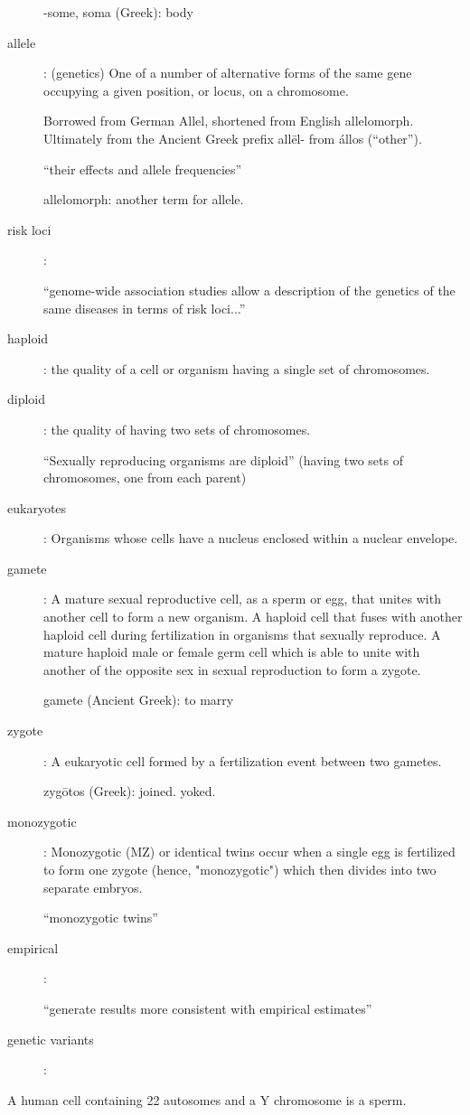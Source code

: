 \begin{description}
	-some, soma (Greek): body

\item[allele] :
	(genetics) One of a number of alternative forms of the same gene occupying a given position, or locus, on a chromosome.

	Borrowed from German Allel, shortened from English allelomorph. Ultimately from the Ancient Greek prefix allēl- from állos (“other”).

	``their effects and allele frequencies''

	allelomorph: another term for allele.

\item[risk loci] :

	``genome-wide association studies allow a description of the genetics of the same diseases in terms of risk loci...''

\item[haploid] :
	the quality of a cell or organism having a single set of chromosomes.

\item[diploid] :
	the quality of having two sets of chromosomes.

	``Sexually reproducing organisms are diploid'' (having two sets of chromosomes, one from each parent)

\item[eukaryotes] :
	Organisms whose cells have a nucleus enclosed within a nuclear envelope.

\item[gamete] :
	A mature sexual reproductive cell, as a sperm or egg, that unites with another cell to form a new organism. A haploid cell that fuses with another haploid cell during fertilization in organisms that sexually reproduce. A mature haploid male or female germ cell which is able to unite with another of the opposite sex in sexual reproduction to form a zygote.

	gamete (Ancient Greek): to marry

\item[zygote] :
	A eukaryotic cell formed by a fertilization event between two gametes.

	zygōtos (Greek): joined. yoked.

\item[monozygotic] :
	Monozygotic (MZ) or identical twins occur when a single egg is fertilized to form one zygote (hence, "monozygotic") which then divides into two separate embryos.



	``monozygotic twins''

\item[empirical] :

	``generate results more consistent with empirical estimates''

	\item[genetic variants]:
\end{description}
\begin{quest}
\item
	A human cell containing 22 autosomes and a Y chromosome is a sperm.


\end{quest}


